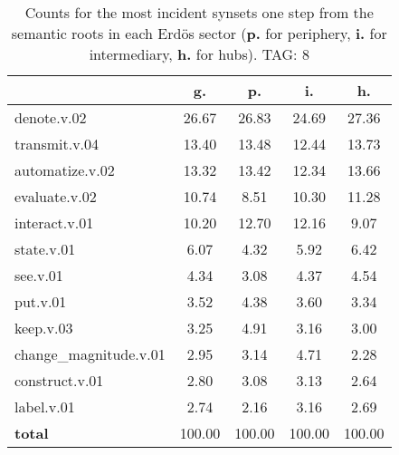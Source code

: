\begin{table}[h!]
\begin{center}
\begin{tabular}{| l | c | c | c | c |}\hline
 & g. & p. & i. & h. \\\hline
denote.v.02 & 26.67  & 26.83  & 24.69  & 27.36 \\\hline
transmit.v.04 & 13.40  & 13.48  & 12.44  & 13.73 \\\hline
automatize.v.02 & 13.32  & 13.42  & 12.34  & 13.66 \\\hline
evaluate.v.02 & 10.74  & 8.51  & 10.30  & 11.28 \\\hline
interact.v.01 & 10.20  & 12.70  & 12.16  & 9.07 \\\hline
state.v.01 & 6.07  & 4.32  & 5.92  & 6.42 \\\hline
see.v.01 & 4.34  & 3.08  & 4.37  & 4.54 \\\hline
put.v.01 & 3.52  & 4.38  & 3.60  & 3.34 \\\hline
keep.v.03 & 3.25  & 4.91  & 3.16  & 3.00 \\\hline
change\_magnitude.v.01 & 2.95  & 3.14  & 4.71  & 2.28 \\\hline
construct.v.01 & 2.80  & 3.08  & 3.13  & 2.64 \\\hline
label.v.01 & 2.74  & 2.16  & 3.16  & 2.69 \\\hline
{{\bf total}} & 100.00  & 100.00  & 100.00  & 100.00 \\\hline
\end{tabular}
\caption{Counts for the most incident synsets one step from the semantic roots in each Erd\"os sector ({\bf p.} for periphery, {\bf i.} for intermediary, {\bf h.} for hubs). TAG: 8}
\end{center}
\end{table}